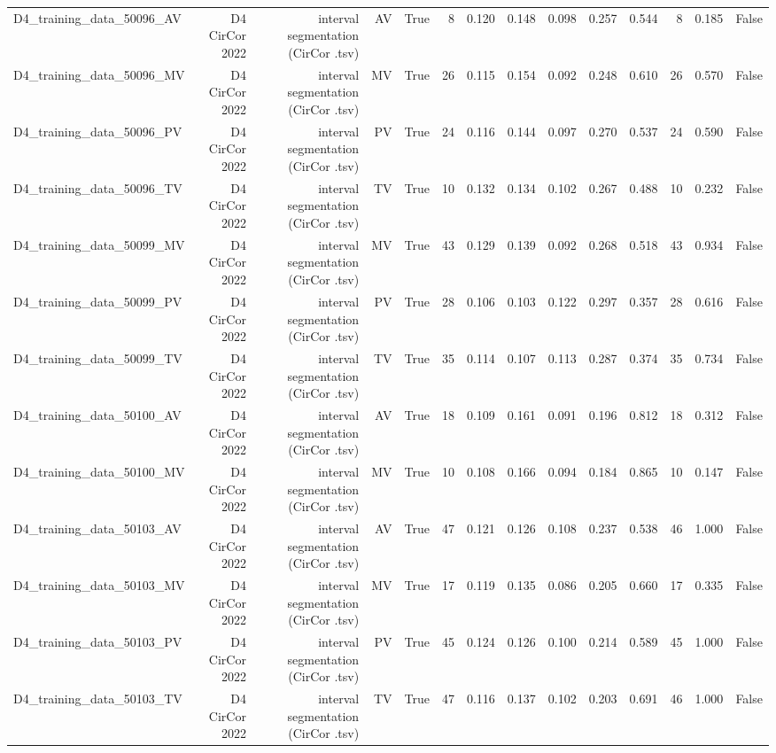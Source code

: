 \begin{table}[htbp]
\begin{tabular}{lrrrrrrrrrrrrr}
    D4\_training\_data\_50096\_AV & D4 CirCor 2022 & interval segmentation (CirCor .tsv) & AV & True & 8 & 0.120 & 0.148 & 0.098 & 0.257 & 0.544 & 8 & 0.185 & False \\
    D4\_training\_data\_50096\_MV & D4 CirCor 2022 & interval segmentation (CirCor .tsv) & MV & True & 26 & 0.115 & 0.154 & 0.092 & 0.248 & 0.610 & 26 & 0.570 & False \\
    D4\_training\_data\_50096\_PV & D4 CirCor 2022 & interval segmentation (CirCor .tsv) & PV & True & 24 & 0.116 & 0.144 & 0.097 & 0.270 & 0.537 & 24 & 0.590 & False \\
    D4\_training\_data\_50096\_TV & D4 CirCor 2022 & interval segmentation (CirCor .tsv) & TV & True & 10 & 0.132 & 0.134 & 0.102 & 0.267 & 0.488 & 10 & 0.232 & False \\
    D4\_training\_data\_50099\_MV & D4 CirCor 2022 & interval segmentation (CirCor .tsv) & MV & True & 43 & 0.129 & 0.139 & 0.092 & 0.268 & 0.518 & 43 & 0.934 & False \\
    D4\_training\_data\_50099\_PV & D4 CirCor 2022 & interval segmentation (CirCor .tsv) & PV & True & 28 & 0.106 & 0.103 & 0.122 & 0.297 & 0.357 & 28 & 0.616 & False \\
    D4\_training\_data\_50099\_TV & D4 CirCor 2022 & interval segmentation (CirCor .tsv) & TV & True & 35 & 0.114 & 0.107 & 0.113 & 0.287 & 0.374 & 35 & 0.734 & False \\
    D4\_training\_data\_50100\_AV & D4 CirCor 2022 & interval segmentation (CirCor .tsv) & AV & True & 18 & 0.109 & 0.161 & 0.091 & 0.196 & 0.812 & 18 & 0.312 & False \\
    D4\_training\_data\_50100\_MV & D4 CirCor 2022 & interval segmentation (CirCor .tsv) & MV & True & 10 & 0.108 & 0.166 & 0.094 & 0.184 & 0.865 & 10 & 0.147 & False \\
    D4\_training\_data\_50103\_AV & D4 CirCor 2022 & interval segmentation (CirCor .tsv) & AV & True & 47 & 0.121 & 0.126 & 0.108 & 0.237 & 0.538 & 46 & 1.000 & False \\
    D4\_training\_data\_50103\_MV & D4 CirCor 2022 & interval segmentation (CirCor .tsv) & MV & True & 17 & 0.119 & 0.135 & 0.086 & 0.205 & 0.660 & 17 & 0.335 & False \\
    D4\_training\_data\_50103\_PV & D4 CirCor 2022 & interval segmentation (CirCor .tsv) & PV & True & 45 & 0.124 & 0.126 & 0.100 & 0.214 & 0.589 & 45 & 1.000 & False \\
    D4\_training\_data\_50103\_TV & D4 CirCor 2022 & interval segmentation (CirCor .tsv) & TV & True & 47 & 0.116 & 0.137 & 0.102 & 0.203 & 0.691 & 46 & 1.000 & False \\

\end{tabular}
\end{table}
